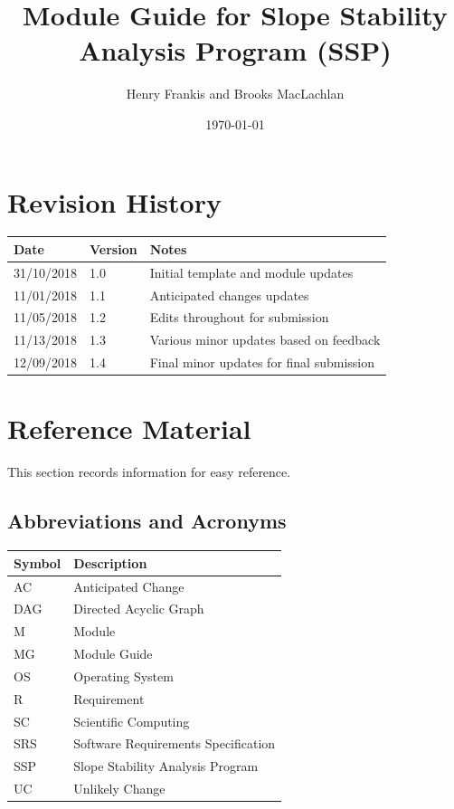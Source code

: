 \documentclass[12pt, titlepage]{article}
\newcommand{\progname}{SSP}
\begin{document}
\title{Module Guide for Slope Stability Analysis Program (\progname)} 
\author{Henry Frankis and Brooks MacLachlan}
\date{\today}

\maketitle


\section{Revision History}

\begin{tabularx}{\textwidth}{p{3cm}p{2cm}X}
	\toprule {\bf Date} & {\bf Version} & {\bf Notes}\\
	\midrule
	31/10/2018 & 1.0 & Initial template and module updates\\
	11/01/2018 & 1.1 & Anticipated changes updates\\
	11/05/2018 & 1.2 & Edits throughout for submission\\
	11/13/2018 & 1.3 & Various minor updates based on feedback\\
	12/09/2018 & 1.4 & Final minor updates for final submission\\
	\bottomrule
\end{tabularx}

\newpage

\section{Reference Material}
This section records information for easy reference.
\subsection{Abbreviations and Acronyms}

\renewcommand{\arraystretch}{1.2}
\begin{tabular}{l l} 
	\toprule		
	\textbf{Symbol} & \textbf{Description}\\
	\midrule 
	AC & Anticipated Change\\
	DAG & Directed Acyclic Graph \\
	M & Module \\
	MG & Module Guide \\
	OS & Operating System \\
	R & Requirement\\
	SC & Scientific Computing \\
	SRS & Software Requirements Specification\\
	\progname & Slope Stability Analysis Program\\
	UC & Unlikely Change \\
	\bottomrule
\end{tabular}\\
\end{document}
